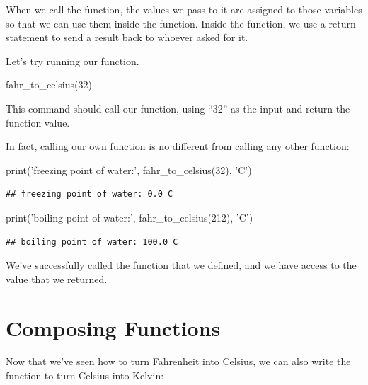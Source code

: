 \documentclass[]{book}
\newenvironment{Shaded}{\begin{snugshade}}{\end{snugshade}}
\newcommand{\BuiltInTok}[1]{#1}
\newcommand{\DecValTok}[1]{\textcolor[rgb]{0.00,0.00,0.81}{#1}}
\newcommand{\NormalTok}[1]{#1}
\newcommand{\StringTok}[1]{\textcolor[rgb]{0.31,0.60,0.02}{#1}}
\theoremstyle{definition}
\theoremstyle{definition}
\theoremstyle{definition}
\theoremstyle{remark}
\begin{document}
When we call the function, the values we pass to it are assigned to
those variables so that we can use them inside the function. Inside the
function, we use a return statement to send a result back to whoever
asked for it.

Let's try running our function.

\begin{Shaded}
\begin{Highlighting}[]
\NormalTok{fahr_to_celsius(}\DecValTok{32}\NormalTok{)}
\end{Highlighting}
\end{Shaded}

This command should call our function, using ``32'' as the input and
return the function value.

In fact, calling our own function is no different from calling any other
function:

\begin{Shaded}
\begin{Highlighting}[]
\BuiltInTok{print}\NormalTok{(}\StringTok{'freezing point of water:'}\NormalTok{, fahr_to_celsius(}\DecValTok{32}\NormalTok{), }\StringTok{'C'}\NormalTok{)}
\end{Highlighting}
\end{Shaded}

\begin{verbatim}
## freezing point of water: 0.0 C
\end{verbatim}

\begin{Shaded}
\begin{Highlighting}[]
\BuiltInTok{print}\NormalTok{(}\StringTok{'boiling point of water:'}\NormalTok{, fahr_to_celsius(}\DecValTok{212}\NormalTok{), }\StringTok{'C'}\NormalTok{)}
\end{Highlighting}
\end{Shaded}

\begin{verbatim}
## boiling point of water: 100.0 C
\end{verbatim}

We've successfully called the function that we defined, and we have
access to the value that we returned.

\hypertarget{composing-functions}{%
\section{Composing Functions}\label{composing-functions}}

Now that we've seen how to turn Fahrenheit into Celsius, we can also
write the function to turn Celsius into Kelvin:
\end{document}
